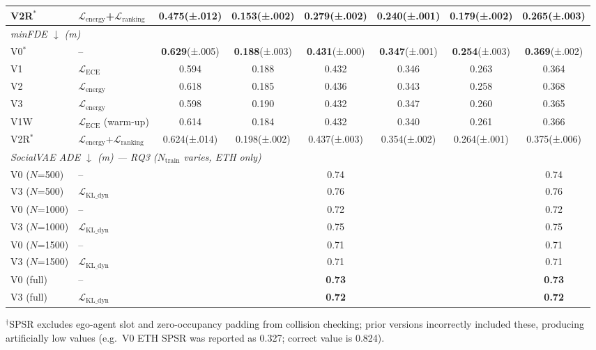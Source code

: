 \begin{table}[t]
{\begin{tabular}{l l c c c c c c}
V2R$^*$ & $\mathcal{L}_{\text{energy}}$+$\mathcal{L}_{\text{ranking}}$
  & 0.475\scriptsize{(±.012)} & 0.153\scriptsize{(±.002)}
  & 0.279\scriptsize{(±.002)} & 0.240\scriptsize{(±.001)}
  & 0.179\scriptsize{(±.002)} & 0.265\scriptsize{(±.003)} \\
\midrule
\multicolumn{8}{l}{\textit{minFDE $\downarrow$ (m)}} \\
V0$^*$  & --
  & \textbf{0.629}\scriptsize{(±.005)} & \textbf{0.188}\scriptsize{(±.003)}
  & \textbf{0.431}\scriptsize{(±.000)} & \textbf{0.347}\scriptsize{(±.001)}
  & \textbf{0.254}\scriptsize{(±.003)} & \textbf{0.369}\scriptsize{(±.002)} \\
V1      & $\mathcal{L}_{\text{ECE}}$
  & 0.594 & 0.188 & 0.432 & 0.346 & 0.263 & 0.364 \\
V2      & $\mathcal{L}_{\text{energy}}$
  & 0.618 & 0.185 & 0.436 & 0.343 & 0.258 & 0.368 \\
V3      & $\mathcal{L}_{\text{energy}}$
  & 0.598 & 0.190 & 0.432 & 0.347 & 0.260 & 0.365 \\
V1W     & $\mathcal{L}_{\text{ECE}}$ (warm-up)
  & 0.614 & 0.184 & 0.432 & 0.340 & 0.261 & 0.366 \\
V2R$^*$ & $\mathcal{L}_{\text{energy}}$+$\mathcal{L}_{\text{ranking}}$
  & 0.624\scriptsize{(±.014)} & 0.198\scriptsize{(±.002)}
  & 0.437\scriptsize{(±.003)} & 0.354\scriptsize{(±.002)}
  & 0.264\scriptsize{(±.001)} & 0.375\scriptsize{(±.006)} \\
\midrule
\multicolumn{8}{l}{\textit{SocialVAE ADE $\downarrow$ (m) — RQ3 ($N_{\text{train}}$ varies, ETH only)}} \\
V0 ($N$=500)  & --
  & \multicolumn{5}{c}{0.74} & 0.74 \\
V3 ($N$=500)  & $\mathcal{L}_{\text{KL\_dyn}}$
  & \multicolumn{5}{c}{0.76} & 0.76 \\
V0 ($N$=1000) & --
  & \multicolumn{5}{c}{0.72} & 0.72 \\
V3 ($N$=1000) & $\mathcal{L}_{\text{KL\_dyn}}$
  & \multicolumn{5}{c}{0.75} & 0.75 \\
V0 ($N$=1500) & --
  & \multicolumn{5}{c}{0.71} & 0.71 \\
V3 ($N$=1500) & $\mathcal{L}_{\text{KL\_dyn}}$
  & \multicolumn{5}{c}{0.71} & 0.71 \\
V0 (full)     & --
  & \multicolumn{5}{c}{\textbf{0.73}} & \textbf{0.73} \\
V3 (full)     & $\mathcal{L}_{\text{KL\_dyn}}$
  & \multicolumn{5}{c}{\textbf{0.72}} & \textbf{0.72} \\
\bottomrule
\end{tabular}%
}
\vspace{2pt}
{\small $^\dagger$SPSR excludes ego-agent slot and zero-occupancy padding
from collision checking; prior versions incorrectly included these,
producing artificially low values (e.g.\ V0 ETH SPSR was reported
as 0.327; correct value is 0.824).}
\end{table}
